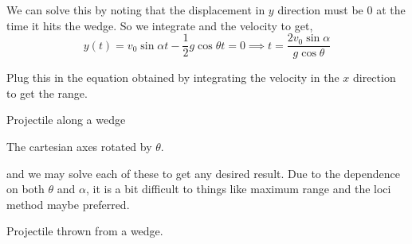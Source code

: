 \begin{exc}
\begin{solution}
        We can solve this by noting that the displacement in \(y\) direction must be \(0\) at the time 
        it hits the wedge. So we integrate and the velocity to get, 
            \begin{equation*}
                y(t) = v_0\sin\alpha t - \frac{1}{2}g\cos\theta t = 0 \implies t = \frac{2v_0\sin\alpha}{g\cos\theta} 
            \end{equation*}
        
        Plug this in the equation obtained by integrating the velocity in the \(x\) direction to get the range.
    \end{solution}
\end{exc}

\begin{marginfigure}
    \vspace{-45em}
    \centering
    \caption{Projectile along a wedge}
    \label{fig: projectilealongwedge}
\end{marginfigure}


\begin{marginfigure}
    \vspace{-15em}
    \centering
    \caption{The cartesian axes rotated by \(\theta\).}
    \label{fig: projectilerotatedaxes}
\end{marginfigure}

and we may solve each of these to get any desired result. Due to the dependence 
on both \(\theta\) and \(\alpha\), it is a bit difficult to things like maximum range
and the loci method maybe preferred.  

\begin{marginfigure}
    \vspace{2em}
    \centering
    \caption{Projectile thrown from a wedge.}
    \label{fig: projectile wedge example}
\end{marginfigure}

